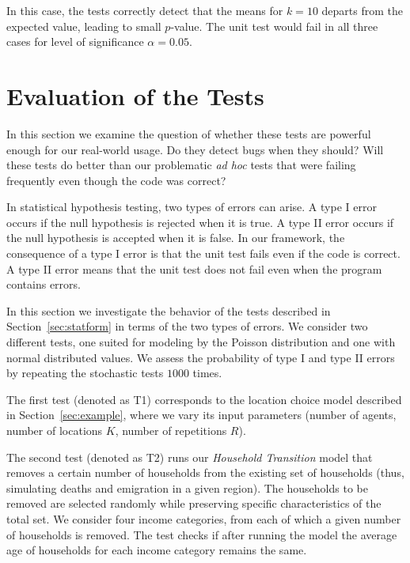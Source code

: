 \documentclass{sig-alternate}
\begin{document}
In this case, the tests correctly detect that the means for $k=10$ departs from
the expected value, leading to small $p$-value.  The unit test would fail
in all three cases for level of significance $\alpha=0.05$.


\section{Evaluation of the Tests}
\label{sec:power}
%
In this section we examine the question of
whether these tests are powerful enough for our 
real-world usage.  Do they detect bugs when they should?  Will these tests do 
better than our problematic \emph{ad hoc} tests that were failing frequently 
even though the code was correct?

In statistical hypothesis testing, two types of errors can arise.  A type I
error occurs if the null hypothesis is rejected when it is true. A type II
error occurs if the null hypothesis is accepted when it is false. 
In our framework, the
consequence of a type I error is that the unit test fails
even if the code is correct. A type II error means that the unit test does
not fail even when the program contains errors. 

In this section we investigate the behavior of the tests described in
Section~\ref{sec:statform} in terms of the two types of errors. We consider
two different tests, one suited for modeling by the Poisson distribution and
one with normal distributed values.  We assess the probability of type I and
type II errors by repeating the stochastic tests $1000$ times.

The first test (denoted as T1) corresponds to the location choice
model described in Section~\ref{sec:example}, where we vary its input
parameters (number of agents, number of locations $K$, number of repetitions
$R$).

The second test (denoted as T2) runs our \emph{Household Transition} model that removes a
certain number of households from the existing set of households (thus,
simulating deaths and emigration in a given region). The households to be
removed are selected randomly while preserving specific characteristics of the
total set. We consider four income categories, from each of which a given
number of households is removed. The test checks if after running the model
the average age of households for each income category remains the same.
\end{document}
